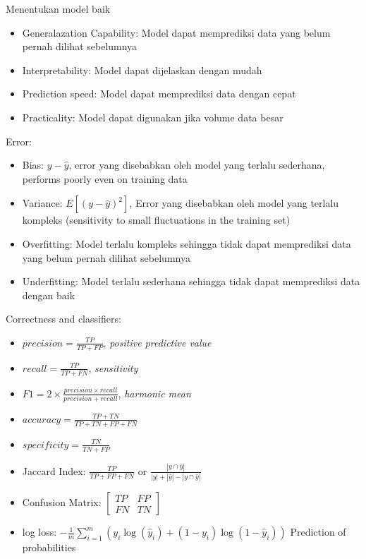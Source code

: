 \documentclass[conference]{IEEEtran}
\begin{document}
Menentukan model baik

\begin{itemize}
    \item Generalazation Capability: Model dapat memprediksi data yang belum pernah dilihat sebelumnya
    \item Interpretability: Model dapat dijelaskan dengan mudah
    \item Prediction speed: Model dapat memprediksi data dengan cepat
    \item Practicality: Model dapat digunakan jika volume data besar
\end{itemize}

\vspace{1em}

Error:

\begin{itemize}
    \item Bias: \(y - \hat{y}\), error yang disebabkan oleh model yang terlalu sederhana, performs poorly even on training data
    \item Variance: \(E[(y - \hat{y})^2]\), Error yang disebabkan oleh model yang terlalu kompleks (sensitivity to small fluctuations in the training set)
    \item Overfitting: Model terlalu kompleks sehingga tidak dapat memprediksi data yang belum pernah dilihat sebelumnya
    \item Underfitting: Model terlalu sederhana sehingga tidak dapat memprediksi data dengan baik
\end{itemize}

Correctness and classifiers:

\begin{itemize}
    \item \(precision = \frac{TP}{TP + FP}\), \textit{positive predictive value}
    \item \(recall = \frac{TP}{TP + FN}\), \textit{sensitivity}
    \item \(F1 = 2 \times \frac{precision \times recall}{precision + recall}\), \textit{harmonic mean}
    \item \(accuracy = \frac{TP + TN}{TP + TN + FP + FN}\)
    \item \(specificity = \frac{TN}{TN + FP}\)
    \item Jaccard Index: \(\frac{TP}{TP + FP + FN}\) or \(\frac{|y \cap \hat{y}|}{|y| + |\hat{y}| - |y \cap \hat{y}|}\)
    \item Confusion Matrix: \(\begin{bmatrix} TP & FP \\ FN & TN \end{bmatrix}\)
    \item log loss: \(-\frac{1}{m} \sum_{i=1}^{m}( y_i \log(\hat{y}_i) + (1 - y_i) \log(1 - \hat{y}_i))\) Prediction of probabilities
\end{itemize}
\end{document}
